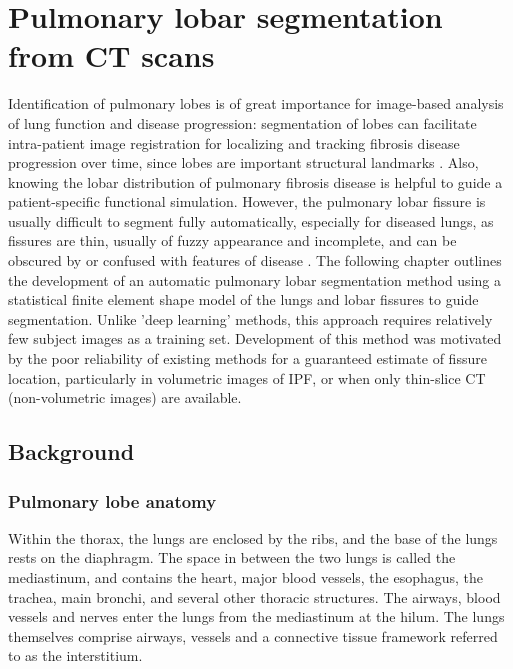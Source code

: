  \chapter{Pulmonary lobar segmentation from CT scans} \label{Yuwen_Segmentation}
Identification of pulmonary lobes is of great importance for image-based analysis of lung function and disease progression: segmentation of lobes can facilitate intra-patient image registration for localizing and tracking fibrosis disease progression over time, since lobes are important structural landmarks \citep{lassen2011interactive}. Also, knowing the lobar distribution of pulmonary fibrosis disease is helpful to guide a patient-specific functional simulation.  However, the pulmonary lobar fissure is usually difficult to segment fully automatically, especially for diseased lungs, as fissures are thin, usually of fuzzy appearance and incomplete, and can be obscured by or confused with features of disease \citep{ukil2009anatomy}. The following chapter outlines the development of an automatic pulmonary lobar segmentation method using a statistical finite element shape model of the lungs and lobar fissures to guide segmentation. Unlike 'deep learning' methods, this approach requires relatively few subject images as a training set. Development of this method was motivated by the poor reliability of existing methods for a guaranteed estimate of fissure location, particularly in volumetric images of IPF, or when only thin-slice CT (non-volumetric images) are available.

\section{Background} \label{SegmentationBackground}
\subsection{Pulmonary lobe anatomy}
Within the thorax, the lungs are enclosed by the ribs, and the base of the lungs rests on the diaphragm. The space in between the two lungs is called the mediastinum, and contains the heart, major blood vessels, the esophagus, the trachea, main bronchi, and several other thoracic structures. The airways, blood vessels and nerves enter the lungs from the mediastinum at the hilum. The lungs themselves comprise airways, vessels and a connective tissue framework referred to as the interstitium.

